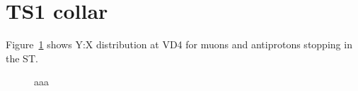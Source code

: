 \section{TS1 collar}

Figure~\ref{figure:vd4_muons_vs_pbars_1037} shows Y:X distribution at VD4 for
muons and antiprotons stopping in the ST.

\begin{figure}[H]
  \caption{
    \label{figure:vd4_muons_vs_pbars_1037}
    aaa
  }
\end{figure}

